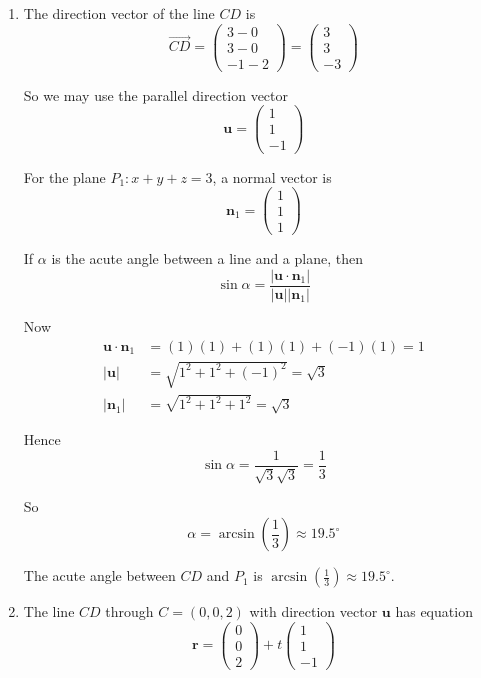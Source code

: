 \documentclass[leqno]{article}
\begin{document}
\begin{enumerate}[
  label=\textbf{\arabic*.},
  leftmargin=*,
  topsep=0pt,
  partopsep=0pt,
  parsep=0pt
]
\vspace*{10pt}

\begin{djsSolution}
\begin{enumerate}[label=\textbf{(\alph*)}]
  \item The direction vector of the line $CD$ is
\[
\overrightarrow{CD}=\begin{pmatrix}3-0\\3-0\\-1-2\end{pmatrix}=\begin{pmatrix}3\\3\\-3\end{pmatrix}
\]

So we may use the parallel direction vector
\[
\mathbf u=\begin{pmatrix}1\\1\\-1\end{pmatrix}
\]

For the plane $P_1:x+y+z=3$, a normal vector is
\[
\mathbf n_1=\begin{pmatrix}1\\1\\1\end{pmatrix}
\]

If $\alpha$ is the acute angle between a line and a plane, then
\[
\sin\alpha=\frac{\left\lvert \mathbf u\cdot \mathbf n_1\right\rvert}{\left\lvert \mathbf u\right\rvert\left\lvert \mathbf n_1\right\rvert}
\]

Now
\begin{align*}
\mathbf u\cdot \mathbf n_1&=(1)(1)+(1)(1)+(-1)(1)=1 \\
\left\lvert \mathbf u\right\rvert&=\sqrt{1^2+1^2+(-1)^2}=\sqrt{3} \\
\left\lvert \mathbf n_1\right\rvert&=\sqrt{1^2+1^2+1^2}=\sqrt{3}
\end{align*}

Hence
\[
\sin\alpha=\frac{1}{\sqrt{3}\sqrt{3}}=\frac{1}{3}
\]

So
\[
\alpha=\arcsin\left(\frac13\right)\approx 19.5^\circ
\]

The acute angle between $CD$ and $P_1$ is $\arcsin\left(\frac13\right)\approx 19.5^\circ$.

  \item The line $CD$ through $C=(0,0,2)$ with direction vector $\mathbf u$ has equation
\[
\mathbf r=\begin{pmatrix}0\\0\\2\end{pmatrix}+t\begin{pmatrix}1\\1\\-1\end{pmatrix}
\]


\end{enumerate}
\end{djsSolution}
\end{enumerate}
\end{document}
